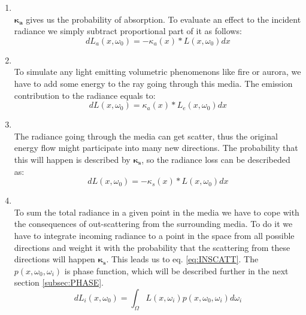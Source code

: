  \begin{enumerate}
 \item {}\\
$\boldsymbol{\kappa_{a}}$ gives us the probability of absorption. To evaluate an effect to the incident radiance we simply subtract proportional part of it as follows:
\begin{equation}
 	dL_{a}(x,\omega_{0})=-\kappa_a(x)*L(x,\omega_{0})dx
 \end{equation}

\item {}\\
To simulate any light emitting volumetric phenomenons like fire or aurora, we have to add some energy to the ray going through this media. The emission contribution to the radiance equals to:
\begin{equation}
 	dL(x,\omega_{0})=\kappa_a(x)*L_{e}(x,\omega_{0})dx
 \end{equation}

\item {}\\
The radiance going through the media can get scatter, thus the original energy flow might participate into many new directions. The probability that this will happen is described by $\boldsymbol{\kappa_{s}}$, so the radiance loss can be describeded as:
\begin{equation}
	dL(x,\omega_{0})=-\kappa_s(x)*L(x,\omega_{0})dx 
\end{equation}

\item {}\\
To sum the total radiance in a given point in the media we have to cope with the consequences of out-scattering from the surrounding media. To do it we have to integrate incoming radiance to a point in the space from all possible directions and weight it with the probability that the scattering from these directions will happen $\boldsymbol{\kappa_{s}}$. This leads us to eq. \ref{eq:INSCATT}. The $p(x,\omega_{0},\omega_{i})$ is phase function, which will be described further in the next section \ref{subsec:PHASE}.
\begin{equation}
\label{eq:INSCATT}
	dL_{i}(x,\omega_{0})=\int_{\Omega}L(x,\omega_{i})p(x,\omega_{0},\omega_{i})d\omega_{i}
 \end{equation}
 
\end{enumerate}

